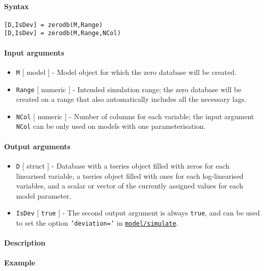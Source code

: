 


	\paragraph{Syntax}\label{syntax}

\begin{verbatim}
[D,IsDev] = zerodb(M,Range)
[D,IsDev] = zerodb(M,Range,NCol)
\end{verbatim}

\paragraph{Input arguments}\label{input-arguments}

\begin{itemize}
\item
  \texttt{M} {[} model {]} - Model object for which the zero database
  will be created.
\item
  \texttt{Range} {[} numeric {]} - Intended simulation range; the zero
  database will be created on a range that also automatically includes
  all the necessary lags.
\item
  \texttt{NCol} {[} numeric {]} - Number of columns for each variable;
  the input argument \texttt{NCol} can be only used on models with one
  parameterisation.
\end{itemize}

\paragraph{Output arguments}\label{output-arguments}

\begin{itemize}
\item
  \texttt{D} {[} struct {]} - Database with a tseries object filled with
  zeros for each linearised variable, a tseries object filled with ones
  for each log-linearised variables, and a scalar or vector of the
  currently assigned values for each model parameter.
\item
  \texttt{IsDev} {[} \texttt{true} {]} - The second output argument is
  always \texttt{true}, and can be used to set the option
  \texttt{'deviation='} in
  \href{model/simulate}{\texttt{model/simulate}}.
\end{itemize}

\paragraph{Description}\label{description}

\paragraph{Example}\label{example}


